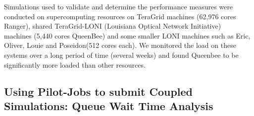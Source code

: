 \documentclass[conference,final]{IEEEtran}
\newcommand{\jhanote}[1]{ {\textcolor{red} { ***Jha: #1 }}}
\newcommand{\jhanote}[1]{}
\begin{document}

Simulations used to validate and determine the performance measures
were conducted on supercomputing resources on TeraGrid machines
(62,976 cores Ranger), shared TeraGrid-LONI (Louisiana Optical Network
Initiative)~\cite{LONI_web} machines (5,440 cores QueenBee) and some
smaller LONI machines such as Eric, Oliver, Louie and Poseidon(512
cores each).  We monitored the load on these systems over a long
period of time (several weeks) and found Queenbee to be significantly
more loaded than other resources.



\subsection{Using Pilot-Jobs to submit Coupled Simulations: Queue Wait
  Time Analysis}
\end{document}
